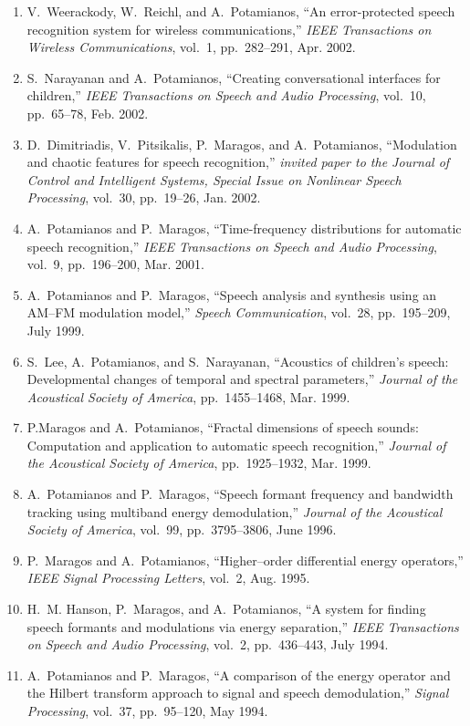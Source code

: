 \begin{enumerate}
\item
V.~Weerackody, W.~Reichl, and A.~Potamianos, ``An error-protected speech
  recognition system for wireless communications,'' {\em IEEE Transactions on
  Wireless Communications}, vol.~1, pp.~282--291, Apr. 2002.

\item
S.~Narayanan and A.~Potamianos, ``Creating conversational interfaces for
  children,'' {\em IEEE Transactions on Speech and Audio Processing}, vol.~10,
  pp.~65--78, Feb. 2002.

\item
D.~Dimitriadis, V.~Pitsikalis, P.~Maragos, and A.~Potamianos, ``Modulation and
  chaotic features for speech recognition,'' {\em invited paper to the Journal
  of Control and Intelligent Systems, Special Issue on Nonlinear Speech
  Processing}, vol.~30, pp.~19--26, Jan. 2002.

\item
A.~Potamianos and P.~Maragos, ``Time-frequency distributions for automatic
  speech recognition,'' {\em IEEE Transactions on Speech and Audio Processing},
  vol.~9, pp.~196--200, Mar. 2001.

\item
A.~Potamianos and P.~Maragos, ``Speech analysis and synthesis using an
  {AM}--{FM} modulation model,'' {\em Speech Communication}, vol.~28,
  pp.~195--209, July 1999.

\item
S.~Lee, A.~Potamianos, and S.~Narayanan, ``Acoustics of children's speech:
  Developmental changes of temporal and spectral parameters,'' {\em Journal of
  the Acoustical Society of America}, pp.~1455--1468, Mar. 1999.

\item
P.Maragos and A.~Potamianos, ``Fractal dimensions of speech sounds: Computation
  and application to automatic speech recognition,'' {\em Journal of the
  Acoustical Society of America}, pp.~1925--1932, Mar. 1999.

\item
A.~Potamianos and P.~Maragos, ``Speech formant frequency and bandwidth tracking
  using multiband energy demodulation,'' {\em Journal of the Acoustical Society
  of America}, vol.~99, pp.~3795--3806, June 1996.

\item
P.~Maragos and A.~Potamianos, ``Higher--order differential energy operators,''
  {\em IEEE Signal Processing Letters}, vol.~2, Aug. 1995.

\item
H.~M. Hanson, P.~Maragos, and A.~Potamianos, ``A system for finding speech
  formants and modulations via energy separation,'' {\em IEEE Transactions on
  Speech and Audio Processing}, vol.~2, pp.~436--443, July 1994.

\item
A.~Potamianos and P.~Maragos, ``A comparison of the energy operator and the
  {H}ilbert transform approach to signal and speech demodulation,'' {\em Signal
  Processing}, vol.~37, pp.~95--120, May 1994.

\end{enumerate}

